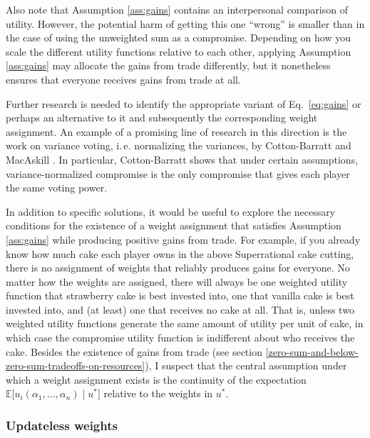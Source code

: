 Also note that Assumption \ref{ass:gains} contains an interpersonal comparison of
utility. However, the potential harm of getting this one ``wrong'' is
smaller than in the case of using the unweighted sum as a compromise.
Depending on how you scale the different utility functions relative to
each other, applying Assumption \ref{ass:gains} may allocate the gains from trade
differently, but it nonetheless ensures that everyone receives gains
from trade at all.

Further research is needed to identify the appropriate variant of Eq.~\eqref{eq:gains} or
perhaps an alternative to it and subsequently the corresponding weight
assignment. An example of a promising line of research in this direction
is the work on variance voting, i.\,e. normalizing the variances, by
Cotton-Barratt \citeyear{Cotton-Barratt2013-ql} and
MacAskill \citeyear{MacAskill2014-ca}. In particular,
Cotton-Barratt shows that under certain assumptions, variance-normalized
compromise is the only compromise that gives each player the same voting
power.

In addition to specific solutions, it would be useful to explore the
necessary conditions for the existence of a weight assignment that
satisfies Assumption \ref{ass:gains} while producing positive gains from trade. For
example, if you already know how much cake each player owns in the above
Superrational cake cutting, there is no assignment of weights that
reliably produces gains for everyone. No matter how the weights are
assigned, there will always be one weighted utility function that
strawberry cake is best invested into, one that vanilla cake is best
invested into, and (at least) one that receives no cake at all. That is,
unless two weighted utility functions generate the same amount of
utility per unit of cake, in which case the compromise utility function
is indifferent about who receives the cake. Besides the existence of
gains from trade (see section
\ref{zero-sum-and-below-zero-sum-tradeoffs-on-resources}), I suspect that the
central assumption under which a weight assignment exists is the
continuity of the expectation
\(\mathbb{E}\lbrack u_{i}(\alpha_{1},\dotsc,\alpha_{n})\mid u^{*}\rbrack\) relative to
the weights in \(u^{*}\).

\hypertarget{updateless-weights}{\subsubsection{Updateless
weights}\label{updateless-weights}}

